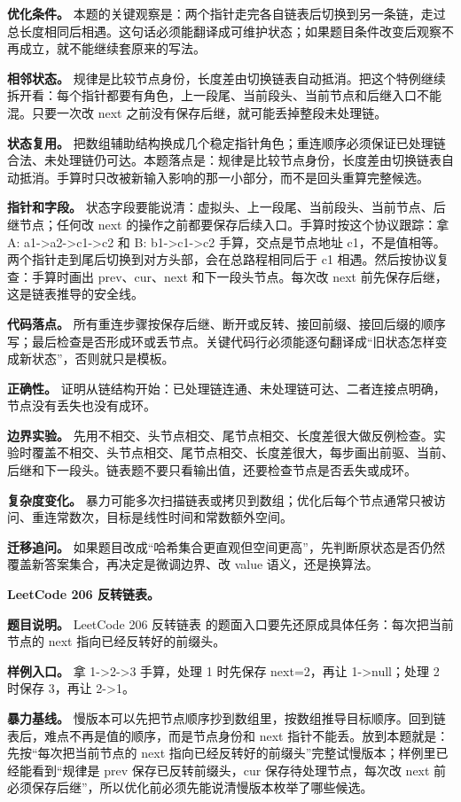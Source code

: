 \textbf{优化条件。} 本题的关键观察是：两个指针走完各自链表后切换到另一条链，走过总长度相同后相遇。这句话必须能翻译成可维护状态；如果题目条件改变后观察不再成立，就不能继续套原来的写法。

\textbf{相邻状态。} 规律是比较节点身份，长度差由切换链表自动抵消。把这个特例继续拆开看：每个指针都要有角色，上一段尾、当前段头、当前节点和后继入口不能混。只要一次改 next 之前没有保存后继，就可能丢掉整段未处理链。

\textbf{状态复用。} 把数组辅助结构换成几个稳定指针角色；重连顺序必须保证已处理链合法、未处理链仍可达。本题落点是：规律是比较节点身份，长度差由切换链表自动抵消。手算时只改被新输入影响的那一小部分，而不是回头重算完整候选。

\textbf{指针和字段。} 状态字段要能说清：虚拟头、上一段尾、当前段头、当前节点、后继节点；任何改 next 的操作之前都要保存后续入口。手算时按这个协议跟踪：拿 A: a1->a2->c1->c2 和 B: b1->c1->c2 手算，交点是节点地址 c1，不是值相等。两个指针走到尾后切换到对方头部，会在总路程相同后于 c1 相遇。然后按协议复查：手算时画出 prev、cur、next 和下一段头节点。每次改 next 前先保存后继，这是链表推导的安全线。

\textbf{代码落点。} 所有重连步骤按保存后继、断开或反转、接回前缀、接回后缀的顺序写；最后检查是否形成环或丢节点。关键代码行必须能逐句翻译成“旧状态怎样变成新状态”，否则就只是模板。

\textbf{正确性。} 证明从链结构开始：已处理链连通、未处理链可达、二者连接点明确，节点没有丢失也没有成环。

\textbf{边界实验。} 先用不相交、头节点相交、尾节点相交、长度差很大做反例检查。实验时覆盖不相交、头节点相交、尾节点相交、长度差很大，每步画出前驱、当前、后继和下一段头。链表题不要只看输出值，还要检查节点是否丢失或成环。

\textbf{复杂度变化。} 暴力可能多次扫描链表或拷贝到数组；优化后每个节点通常只被访问、重连常数次，目标是线性时间和常数额外空间。

\textbf{迁移追问。} 如果题目改成“哈希集合更直观但空间更高”，先判断原状态是否仍然覆盖新答案集合，再决定是微调边界、改 value 语义，还是换算法。

\noindent\textbf{LeetCode 206 反转链表。}

\textbf{题目说明。} LeetCode 206 反转链表 的题面入口要先还原成具体任务：每次把当前节点的 next 指向已经反转好的前缀头。

\textbf{样例入口。} 拿 1->2->3 手算，处理 1 时先保存 next=2，再让 1->null；处理 2 时保存 3，再让 2->1。

\textbf{暴力基线。} 慢版本可以先把节点顺序抄到数组里，按数组推导目标顺序。回到链表后，难点不再是值的顺序，而是节点身份和 next 指针不能丢。放到本题就是：先按“每次把当前节点的 next 指向已经反转好的前缀头”完整试慢版本；样例里已经能看到“规律是 prev 保存已反转前缀头，cur 保存待处理节点，每次改 next 前必须保存后继”，所以优化前必须先能说清慢版本枚举了哪些候选。

